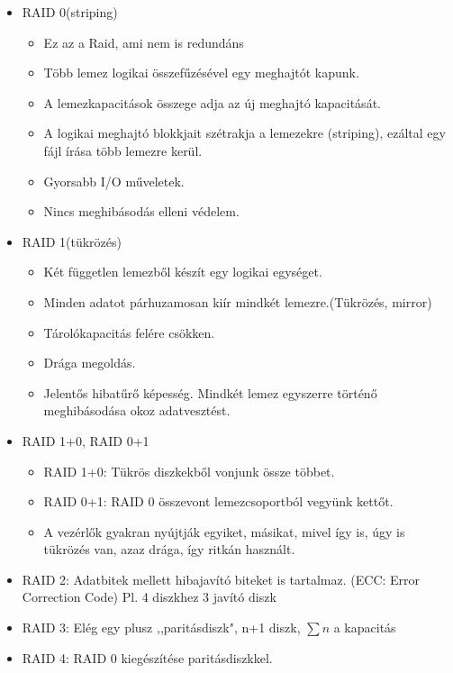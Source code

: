 \documentclass[margin=0px]{article}
\begin{document}
\begin{itemize}
    \item RAID 0(striping)
          \begin{itemize}
              \item Ez az a Raid, ami nem is redundáns
              \item Több lemez logikai összefűzésével egy meghajtót kapunk.
              \item A lemezkapacitások összege adja az új meghajtó kapacitását.
              \item A logikai meghajtó blokkjait szétrakja a lemezekre (striping), ezáltal egy fájl írása több lemezre kerül.
              \item Gyorsabb I/O műveletek.
              \item Nincs meghibásodás elleni védelem.
          \end{itemize}
    \item RAID 1(tükrözés)
          \begin{itemize}
              \item Két független lemezből készít egy logikai egységet.
              \item Minden adatot párhuzamosan kiír mindkét lemezre.(Tükrözés, mirror)
              \item Tárolókapacitás felére csökken.
              \item Drága megoldás.
              \item Jelentős hibatűrő képesség. Mindkét lemez egyszerre történő meghibásodása okoz adatvesztést.
          \end{itemize}
    \item RAID 1+0, RAID 0+1
          \begin{itemize}
              \item RAID 1+0: Tükrös diszkekből vonjunk össze többet.
              \item RAID 0+1: RAID 0 összevont lemezcsoportból vegyünk kettőt.
              \item A vezérlők gyakran nyújtják egyiket, másikat, mivel így is, úgy is tükrözés van, azaz drága, így ritkán használt.
          \end{itemize}
    \item RAID 2: Adatbitek mellett hibajavító biteket is tartalmaz. (ECC: Error Correction Code) Pl. 4 diszkhez 3 javító diszk
    \item RAID 3: Elég egy plusz ,,paritásdiszk", n+1 diszk, $\sum{n}$ a kapacitás
    \item RAID 4: RAID 0 kiegészítése paritásdiszkkel.

\end{itemize}
\end{document}

